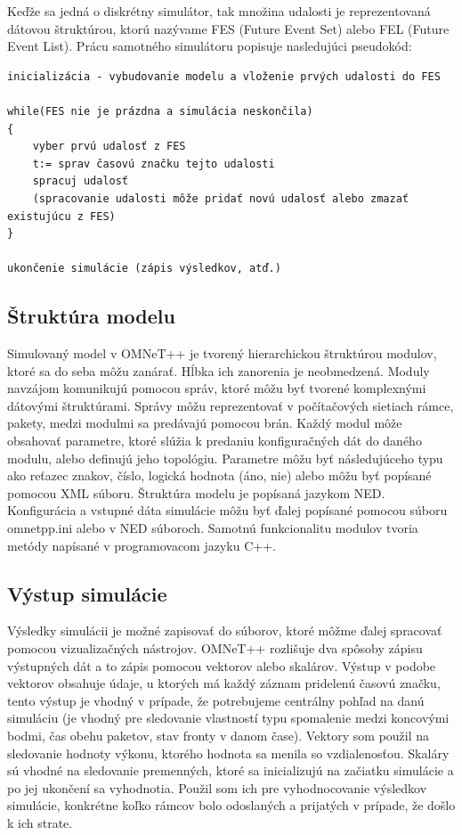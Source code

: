 \documentclass[11pt,twoside,a4paper]{book}
\begin{document}
Keďže sa jedná o diskrétny simulátor, tak množina udalosti je reprezentovaná dátovou štruktúrou, ktorú nazývame FES (Future Event Set) alebo FEL (Future Event List). Prácu samotného simulátoru popisuje nasledujúci pseudokód:

\begin{verbatim}
inicializácia - vybudovanie modelu a vloženie prvých udalosti do FES

while(FES nie je prázdna a simulácia neskončila) 
{
	vyber prvú udalosť z FES
	t:= sprav časovú značku tejto udalosti
	spracuj udalosť
	(spracovanie udalosti môže pridať novú udalosť alebo zmazať existujúcu z FES)
}

ukončenie simulácie (zápis výsledkov, atď.)
\end{verbatim}

\subsection{Štruktúra modelu}
Simulovaný model v OMNeT++ je tvorený hierarchickou štruktúrou modulov, ktoré sa do seba môžu zanárať. Hĺbka ich zanorenia je neobmedzená. Moduly navzájom komunikujú pomocou správ, ktoré môžu byť tvorené komplexnými dátovými štruktúrami. Správy môžu reprezentovať v počítačových sietiach rámce, pakety, medzi modulmi sa predávajú pomocou brán. Každý modul môže obsahovať parametre, ktoré slúžia k predaniu konfiguračných dát do daného modulu, alebo definujú jeho topológiu. Parametre môžu byť následujúceho typu ako reťazec znakov, číslo, logická hodnota (áno, nie) alebo môžu byť popísané pomocou XML súboru. Štruktúra modelu je popísaná jazykom NED. Konfigurácia a vstupné dáta simulácie môžu byť ďalej popísané pomocou súboru omnetpp.ini alebo v NED súboroch. Samotnú funkcionalitu modulov tvoria metódy napísané v programovacom jazyku C++.


\subsection{Výstup simulácie}
Výsledky simulácii je možné zapisovať do súborov, ktoré môžme ďalej spracovať pomocou vizualizačných nástrojov. OMNeT++ rozlišuje dva spôsoby zápisu výstupných dát a to zápis pomocou vektorov alebo skalárov. Výstup v podobe vektorov obsahuje údaje, u ktorých má každý záznam pridelenú časovú značku, tento výstup je vhodný v prípade, že potrebujeme centrálny pohľad na danú simuláciu (je vhodný pre sledovanie vlastností typu spomalenie medzi koncovými bodmi, čas obehu paketov, stav fronty v danom čase). Vektory som použil na sledovanie hodnoty výkonu, ktorého hodnota sa menila so vzdialenosťou. Skaláry sú vhodné na sledovanie premenných, ktoré sa inicializujú na začiatku simulácie a po jej ukončení sa vyhodnotia. Použil som ich pre vyhodnocovanie výsledkov simulácie, konkrétne koľko rámcov bolo odoslaných a prijatých v prípade, že došlo k ich strate.
\end{document}

